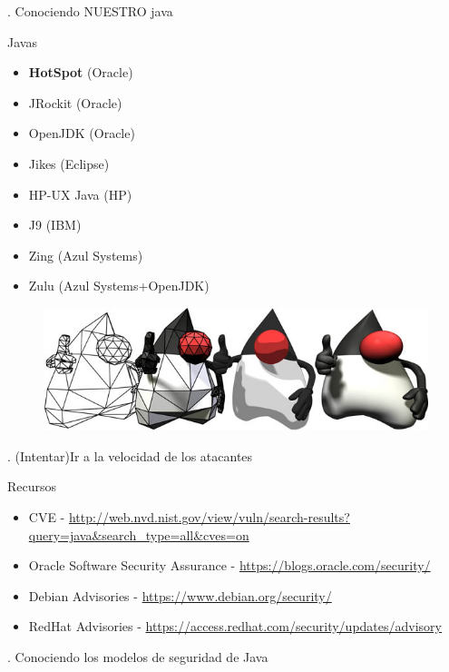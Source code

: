 \documentclass[12pt]{beamer}
\begin{document}
\begin{frame}
\LARGE {}. Conociendo NUESTRO java
\end{frame}


\begin{frame}{Javas}
\begin{itemize}
\item \textbf{HotSpot} (Oracle)
\item JRockit (Oracle)
\item OpenJDK (Oracle)
\item Jikes (Eclipse)
\item HP-UX Java (HP)
\item J9 (IBM)
\item Zing (Azul Systems)
\item Zulu (Azul Systems+OpenJDK)
\end{itemize}
\begin{figure}
\centering
\includegraphics[width=0.6\linewidth]{Images/dukes.jpg}
\end{figure}
\end{frame}

\begin{frame}
\LARGE {}. (Intentar)Ir a la velocidad de los atacantes
\end{frame}

\begin{frame}{Recursos}
\begin{itemize}
\item CVE - \url{http://web.nvd.nist.gov/view/vuln/search-results?query=java\&search\_type=all\&cves=on}
\item Oracle Software Security Assurance - \url{https://blogs.oracle.com/security/}
\item Debian Advisories - \url{https://www.debian.org/security/}
\item RedHat Advisories - \url{https://access.redhat.com/security/updates/advisory}
\end{itemize}
\end{frame}

\begin{frame}
\LARGE {}. Conociendo los modelos de seguridad de Java
\end{frame}
\end{document}
